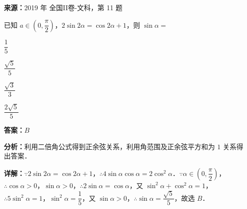 \begin{question}[points=5]
\textbf{来源：}2019 年 全国II卷-文科，第 11 题\par
已知 $a\in\left(0,\dfrac{\pi}{2}\right)$，$2\sin2\alpha=\cos2\alpha+1$，则 $\sin\alpha=$
\begin{choices}
  \item $\dfrac{1}{5}$
  \item $\dfrac{\sqrt{5}}{5}$
  \item $\dfrac{\sqrt{3}}{3}$
  \item $\dfrac{2\sqrt{5}}{5}$
\end{choices}
\begin{solution}
\textbf{答案：}$B$

\textbf{分析：}利用二倍角公式得到正余弦关系，利用角范围及正余弦平方和为 $1$ 关系得出答案．

\textbf{详解：}$\because 2\sin2\alpha=\cos2\alpha+1$，$\therefore 4\sin\alpha\cos\alpha=2\cos^2\alpha$．$\because \alpha\in\left(0,\dfrac{\pi}{2}\right)$，$\therefore \cos\alpha>0$，$\sin\alpha>0$，$\therefore 2\sin\alpha=\cos\alpha$，又 $\sin^2\alpha+\cos^2\alpha=1$，$\therefore 5\sin^2\alpha=1$，$\sin^2\alpha=\dfrac{1}{5}$，又 $\sin\alpha>0$，$\therefore \sin\alpha=\dfrac{\sqrt{5}}{5}$，故选 $B$．
\end{solution}
\end{question}

